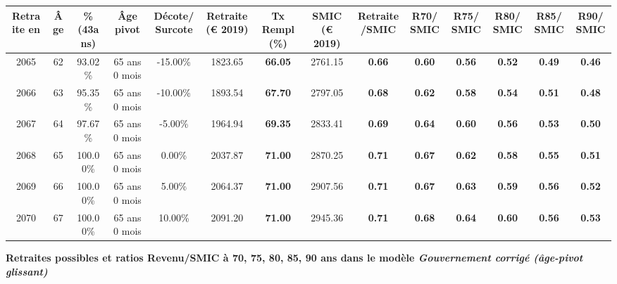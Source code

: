 \begin{adjustbox}{max width=\textwidth} 
\begin{tabular}[htb]{|c|c||c|c|c||c|c||c|c||c|c|c|c|c|} 
\hline 
 Retraite en &  Âge &  \%(43ans) &  Âge pivot &  Décote/Surcote &  Retraite (\euro{} 2019) &  Tx Rempl(\%) &  SMIC (\euro{} 2019) &  Retraite/SMIC &  R70/SMIC &  R75/SMIC &  R80/SMIC &  R85/SMIC &  R90/SMIC \\ 
\hline \hline 
 2065 &  62 &  93.02\% &  65 ans 0 mois &  -15.00\% &  1823.65 &  {\bf 66.05} &  2761.15 &  {\bf {\color{red} 0.66}} &  {\bf {\color{red} 0.60}} &  {\bf {\color{red} 0.56}} &  {\bf {\color{red} 0.52}} &  {\bf {\color{red} 0.49}} &  {\bf {\color{red} 0.46}} \\ 
\hline 
 2066 &  63 &  95.35\% &  65 ans 0 mois &  -10.00\% &  1893.54 &  {\bf 67.70} &  2797.05 &  {\bf {\color{red} 0.68}} &  {\bf {\color{red} 0.62}} &  {\bf {\color{red} 0.58}} &  {\bf {\color{red} 0.54}} &  {\bf {\color{red} 0.51}} &  {\bf {\color{red} 0.48}} \\ 
\hline 
 2067 &  64 &  97.67\% &  65 ans 0 mois &  -5.00\% &  1964.94 &  {\bf 69.35} &  2833.41 &  {\bf {\color{red} 0.69}} &  {\bf {\color{red} 0.64}} &  {\bf {\color{red} 0.60}} &  {\bf {\color{red} 0.56}} &  {\bf {\color{red} 0.53}} &  {\bf {\color{red} 0.50}} \\ 
\hline 
 2068 &  65 &  100.00\% &  65 ans 0 mois &  0.00\% &  2037.87 &  {\bf 71.00} &  2870.25 &  {\bf {\color{red} 0.71}} &  {\bf {\color{red} 0.67}} &  {\bf {\color{red} 0.62}} &  {\bf {\color{red} 0.58}} &  {\bf {\color{red} 0.55}} &  {\bf {\color{red} 0.51}} \\ 
\hline 
 2069 &  66 &  100.00\% &  65 ans 0 mois &  5.00\% &  2064.37 &  {\bf 71.00} &  2907.56 &  {\bf {\color{red} 0.71}} &  {\bf {\color{red} 0.67}} &  {\bf {\color{red} 0.63}} &  {\bf {\color{red} 0.59}} &  {\bf {\color{red} 0.56}} &  {\bf {\color{red} 0.52}} \\ 
\hline 
 2070 &  67 &  100.00\% &  65 ans 0 mois &  10.00\% &  2091.20 &  {\bf 71.00} &  2945.36 &  {\bf {\color{red} 0.71}} &  {\bf {\color{red} 0.68}} &  {\bf {\color{red} 0.64}} &  {\bf {\color{red} 0.60}} &  {\bf {\color{red} 0.56}} &  {\bf {\color{red} 0.53}} \\ 
\hline 
\hline 
\end{tabular} 
\end{adjustbox} 
 
 \vspace{0.1cm} 
{\bf \noindent Retraites possibles et ratios Revenu/SMIC à 70, 75, 80, 85, 90 ans dans le modèle \emph{Gouvernement corrigé (âge-pivot glissant)}}  
 
